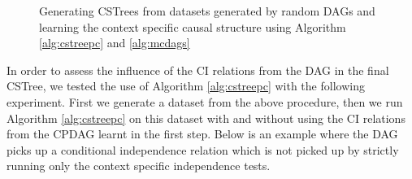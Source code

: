 \documentclass{tufte-book}
\begin{document}
\begin{figure}[!h]\label{fig:synthetic_exp1}
   \begin{floatrow}
%
\caption{Generating CSTrees from datasets generated by random DAGs and learning the context specific causal structure using Algorithm \ref{alg:cstreepc} and \ref{alg:mcdags}}
        
   \end{floatrow}
\end{figure}






In order to assess the influence of the CI relations from the DAG in the final CSTree, we tested the use of Algorithm \ref{alg:cstreepc} with the following experiment. First we generate a dataset from the above procedure, then we run Algorithm \ref{alg:cstreepc} on this dataset with and without using the CI relations from the CPDAG learnt in the first step. Below is an example where the DAG picks up a conditional independence relation which is not picked up by strictly running only the context specific independence tests.
\end{document}

